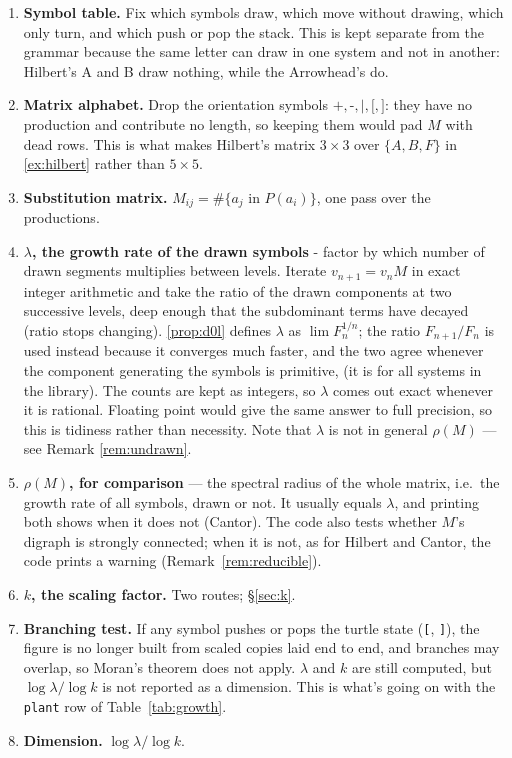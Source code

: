 \documentclass[11pt, a4paper]{article}
\theoremstyle{plain}
\theoremstyle{definition}
\theoremstyle{remark}
\begin{document}
\begin{enumerate}
    \item \textbf{Symbol table.} Fix which symbols draw, which move without drawing, which only turn, and which push or pop the stack. 
    This is kept separate from the grammar because the same letter can draw in one system and not in another: Hilbert's A and B draw nothing, while the Arrowhead's do.

    \item \textbf{Matrix alphabet.} Drop the orientation symbols
    $\texttt{+},\texttt{-},\texttt{|},\texttt{[},\texttt{]}$: they have no
    production and contribute no length, so keeping them would pad $M$ with
    dead rows. This is what makes Hilbert's matrix $3\times3$ over
    $\{A,B,F\}$ in \ref{ex:hilbert} rather than $5\times5$.

    \item \textbf{Substitution matrix.} $M_{ij}=\#\{a_j\text{ in }P(a_i)\}$,
    one pass over the productions.

    \item \textbf{$\lambda$, the growth rate of the drawn symbols} - factor by which number of drawn segments multiplies between levels. Iterate
    $v_{n+1}=v_nM$ in exact integer arithmetic and take the ratio of the drawn
    components at two successive levels, deep enough that the subdominant terms
    have decayed (ratio stops changing). \ref{prop:d0l} defines $\lambda$ as $\lim F_n^{1/n}$; the
    ratio $F_{n+1}/F_n$ is used instead because it converges much faster, and
    the two agree whenever the component generating the symbols is primitive, (it is for all systems in the library).
    The counts are kept as integers, so $\lambda$ comes out exact whenever it is rational.
    Floating point would give the same answer to full precision, so this is tidiness rather than necessity. Note that $\lambda$ is not in general $\rho(M)$ --- see Remark \ref{rem:undrawn}.

    \item \textbf{$\rho(M)$, for comparison} --- the spectral radius of the whole
    matrix, i.e.\ the growth rate of all symbols, drawn or not. It usually equals
    $\lambda$, and printing both shows when it does not (Cantor). The code also
    tests whether $M$'s digraph is strongly connected;
    when it is not, as for Hilbert and Cantor, the code prints a warning (Remark~\ref{rem:reducible}).

    \item \textbf{$k$, the scaling factor.} Two routes; \S\ref{sec:k}.

    \item \textbf{Branching test.} If any symbol pushes or pops the turtle state
(\texttt{[}, \texttt{]}), the figure is no longer built from scaled copies
laid end to end, and branches may overlap, so Moran's theorem does not apply.
$\lambda$ and $k$ are still computed, but $\log\lambda/\log k$ is not reported
as a dimension. This is what's going on with the \texttt{plant} row of Table~\ref{tab:growth}.

    \item \textbf{Dimension.} $\log\lambda/\log k$.
\end{enumerate}
\end{document}
